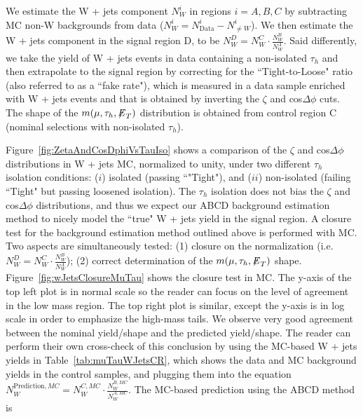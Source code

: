 We estimate the W + jets component $N_{W}^{i}$ in regions $i=A,B,C$ by subtracting MC non-W backgrounds
from data ($N_{W}^{i}=N_{\textrm{Data}}^{i}-N_{\neq W}^{i}$). We then estimate the W + jets component in the signal region D, to
be $N_{W}^{D} = N_{W}^{C} \cdot \frac{N_{W}^{B}}{N_{W}^{A}}$. Said differently, we take the yield of W + jets events in data containing a non-isolated $\tau_{h}$ 
and then extrapolate to the signal region by correcting for the ``Tight-to-Loose" ratio (also referred to as a ``fake rate"), which is measured in a data sample 
enriched with W + jets events and that is obtained by inverting the $\zeta$ and cos$\Delta\phi$ cuts. The shape of the $m(\mu,\tau_{h},{\not\mathrel{E}}_T)$ distribution is 
obtained from control region C (nominal selections with non-isolated $\tau_{h}$).

Figure~\ref{fig:ZetaAndCosDphiVsTauIso} shows a comparison of the $\zeta$ and cos$\Delta\phi$ distributions in W + jets MC, normalized to unity, under two 
different $\tau_{h}$ isolation conditions: ($i$) isolated (passing ``"Tight"), and ($ii$) non-isolated (failing ``Tight" but passing loosened isolation). The 
$\tau_{h}$ isolation does not bias the $\zeta$ and cos$\Delta\phi$ distributions, and thus we expect our ABCD background estimation method to nicely model the ``true" W + 
jets yield in the signal region. A closure test for the background estimation method outlined above is performed with MC. Two aspects are simultaneously tested: 
(1) closure on the normalization (i.e. $N_{W}^{D} = N_{W}^{C} \cdot \frac{N_{W}^{B}}{N_{W}^{A}}$); (2) correct determination of the $m(\mu,\tau_{h},{\not\mathrel{E}}_T)$ shape. 
Figure~\ref{fig:wJetsClosureMuTau} shows the closure test in MC. The y-axis of the top left plot is in normal scale so the reader can focus on the level of 
agreement in the low mass region. The top right plot is similar, except the y-axis is in log scale in order to emphasize the high-mass tails. We observe very 
good agreement between the nominal yield/shape and the predicted yield/shape. The reader can perform their own cross-check of this conclusion by using the 
MC-based W + jets yields in Table~\ref{tab:muTauWJetsCR}, which shows the data and MC background yields in the control samples, and plugging them into the 
equation $N_{W}^{\textrm{Prediction},MC} = N_{W}^{C,MC} \cdot \frac{N_{W}^{B,MC}}{N_{W}^{A,MC}}$. The MC-based prediction using the ABCD method is 
